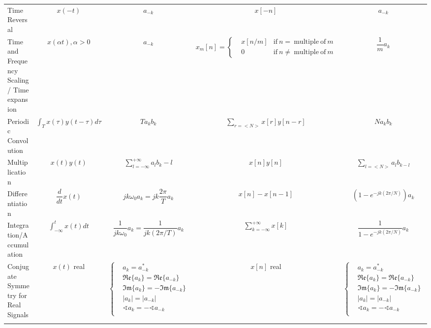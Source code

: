 \documentclass[landscape,a4paper]{article}
\begin{document}
\begin{table}[htbp]
\begin{tabular}{p{12em}<{\centering}cccc}
Time Reversal & $x(-t)$ & $a_{-k}$ 
& $x[-n]$ & $a_{-k}$ \\

Time and Frequency Scaling / Time expansion & $x(\alpha t),\alpha>0$ & $a_{-k}$ 
& $x_m[n]=\left\{\begin{aligned}
& x[n/m] & \mathrm{if}\ n=\ \mathrm{multiple\ of}\ m\\
& 0 & \mathrm{if}\ n\neq\ \mathrm{multiple\ of}\ m
\end{aligned}\right.$ & $\dfrac{1}{m}a_k$\\

Periodic Convolution & $\displaystyle\int_Tx(\tau)y(t-\tau)d\tau$ & $Ta_kb_k$
& $\displaystyle\sum_{r=<N>}x[r]y[n-r]$ & $Na_kb_k$ \\

Multiplication & $x(t)y(t)$ & $\displaystyle\sum_{l=-\infty}^{+\infty}a_lb_k-l$ 
& $x[n]y[n]$ & $\displaystyle\sum_{l=<N>}a_lb_{k-l}$\\

Differentiation & $\dfrac{d}{dt}x(t)$ & $jk\omega_0a_k=jk\dfrac{2\pi}{T}a_k$
& $x[n]-x[n-1]$ & $(1-e^{-jk(2\pi/N)})a_k$ \\

Integration/Accumulation & $\displaystyle\int_{-\infty}^tx(t)dt$ & $\dfrac{1}{jk\omega_0}a_k=\dfrac{1}{jk(2\pi/T)}a_k$ 
& $\displaystyle\sum\limits_{k=-\infty}^{+\infty}x[k]$ & $\dfrac{1}{1-e^{-jk(2\pi/N)}}a_k$ \\

Conjugate Symmetry for Real Signals & $x(t)$ real & 
$\left\lbrace\begin{aligned}
&a_k=a^*_{-k} \\
&\mathfrak{Re}\{a_k\}=\mathfrak{Re}\{a_{-k}\} \\
&\mathfrak{Im}\{a_k\}=-\mathfrak{Im}\{a_{-k}\} \\
&|a_k|=|a_{-k}| \\
&\sphericalangle a_k=-\sphericalangle a_{-k} \\
\end{aligned}\right.$
& $x[n]$ real & 
$\left\lbrace\begin{aligned}
&a_k=a^*_{-k} \\
&\mathfrak{Re}\{a_k\}=\mathfrak{Re}\{a_{-k}\} \\
&\mathfrak{Im}\{a_k\}=-\mathfrak{Im}\{a_{-k}\} \\
&|a_k|=|a_{-k}| \\
&\sphericalangle a_k=-\sphericalangle a_{-k} \\
\end{aligned}\right.$\\
& \\


\end{tabular}
\end{table}
\end{document}
